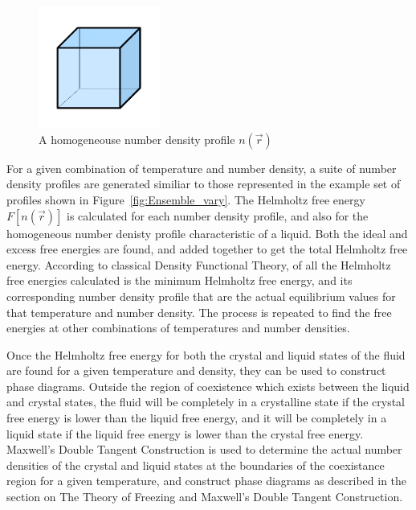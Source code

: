 \documentclass[double,12pt]{beavtex}
\begin{document}
 \begin{figure}[h!]
    \centering
    \includegraphics[height=4cm]{figs/homogeneous_bold-box.pdf}
    \caption{A homogeneouse number density profile $n(\vec{r})$}
    \label{fig:homogen_denisty}
  \end{figure}   


For a given combination of temperature and number density, a suite of number 
density profiles are generated similiar to those represented in the example 
set of profiles shown in Figure~\ref{fig:Ensemble_vary}. 
The Helmholtz free energy $F[n(\vec{r})]$ is calculated for each number 
density profile, and also for the homogeneous number denisty profile 
characteristic of a liquid. Both the ideal and excess free energies are 
found, and added together to get the total Helmholtz free energy.
According to classical Density Functional Theory, of all the Helmholtz 
free energies calculated is the minimum Helmholtz free energy, and its 
corresponding number density profile that are the actual equilibrium values 
for that temperature and number density.
The process is repeated to find the free energies at other combinations 
of temperatures and number densities. 

Once the Helmholtz free energy for both the crystal and liquid states of 
the fluid are found for a given temperature and density, they can be 
used to construct phase diagrams.
Outside the region of coexistence which exists between the liquid and 
crystal states, the fluid will be completely in a crystalline state if the 
crystal free energy is lower than the liquid free energy, and it will be 
completely in a liquid state if the liquid free energy is lower than 
the crystal free energy. Maxwell's Double Tangent Construction is used 
to determine the actual number densities of the crystal and liquid states
at the boundaries of the coexistance region for a given temperature, 
and construct phase diagrams as described in the section on The Theory of
Freezing and Maxwell's Double Tangent Construction.
\end{document}
